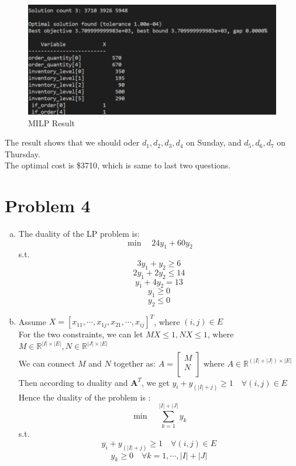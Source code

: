 \documentclass[a4paper]{article}
\begin{document}
\begin{enumerate}[(a)]
        \begin{figure}[H]
            \centering
            \includegraphics[scale=0.6]{P3c2.png}
            \caption{MILP Result}
        \end{figure} 
        The result shows that we should oder $d_1,d_2,d_3,d_4$ on Sunday, and $d_5,d_6,d_7$ on Thursday.
        \\The optimal cost is \$3710, which is same to last two questions.
    \end{enumerate}
\section{Problem 4}
\begin{enumerate}[(a)]
    \item The duality of the LP problem is:
    $$\min\quad 24y_1+60y_2$$
    s.t. 
    $$3y_1+y_2\geq6$$
    $$2y_1+2y_2\leq14$$
    $$y_1+4y_2=13$$
    $$y_1\geq0$$
    $$y_2\leq0$$
    \item Assume $X=[x_{11},\cdots,x_{1j},x_{21},\cdots,x_{ij}]^T$, where $(i,j)\in E$
    \\For the two constraints, we can let $MX\leq1,NX\leq1$, where $M\in\mathbb{R}^{|I|\times|E|},N\in\mathbb{R}^{|J|\times|E|}$
    \\We can connect $M$ and $N$ together as:
    $ A=\left[\begin{array}{c}   
        M\\ 
        N\\ 
      \end{array}\right]$
      where $A\in\mathbb{R}^{(|I|+|J|)\times|E|}$
    \\Then according to duality and $\textbf{A}^T$, we get $y_i+y_{(|I|+j)}\geq1\quad\forall(i,j)\in E$
    \\Hence the duality of the problem is :
    $$\min\quad \sum_{k=1}^{|I|+|J|}y_k$$
    s.t. 
    $$y_i+y_{(|I|+j)}\geq1\quad\forall(i,j)\in E$$
    $$y_k\geq0\quad\forall k=1,\cdots,|I|+|J|$$
\end{enumerate}
\newpage
\end{document}
